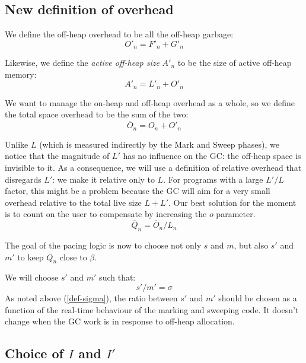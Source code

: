 \documentclass{article}
\begin{document}
\subsection{New definition of overhead}

We define the off-heap overhead to be all the off-heap garbage:
\begin{equation}\label{def-O'}
O'_n = F'_n + G'_n
\end{equation}

Likewise, we define the \emph{active off-heap size} $A'_n$ to be the
size of active off-heap memory:
\begin{equation}\label{def-A'}
A'_n = L'_n + O'_n
\end{equation}

We want to manage the on-heap and off-heap overhead as a whole, so we
define the total space overhead to be the sum of the two:
\begin{equation}\label{def-Obar}
 \overline{O}_n = O_n + O'_n
\end{equation}

Unlike $L$ (which is measured indirectly by the Mark and Sweep
phases), we notice that the magnitude of $L'$ has no influence on the
GC: the off-heap space is invisible to it. As a consequence, we will
use a definition of relative overhead that disregards $L'$: we make it
relative only to $L$.
For programs with a large $L'/L$ factor, this might be a problem because
the GC will aim for a very small overhead relative to the total live
size $L+L'$. Our best solution for the moment is to count on the user
to compensate by increasing the $o$ parameter.
\begin{equation}\label{def-Qbar}
\overline{Q}_n = \overline{O}_n / L_n
\end{equation}


The goal of the pacing logic is now to choose not only $s$ and $m$,
but also $s'$ and $m'$ to keep $\overline{Q}_n$ close to $\beta$.

We will choose $s'$ and $m'$ such that:
\begin{equation}\label{sigma-prime}
s' / m' = \sigma
\end{equation}
As noted above (\eqref{def-sigma}), the ratio between $s'$ and $m'$
should be chosen as a function of the real-time behaviour of the
marking and sweeping code. It doesn't change when the GC work is in
response to off-heap allocation.

\subsection[Choice of I and I']{Choice of $I$ and $I'$}
\end{document}
